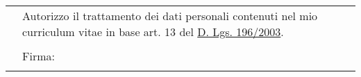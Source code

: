 \documentclass[totpages, helvetica, openbib, italian]{europecv}
\begin{document}
	\null{}
	\flushright
	\begin{tabular}{rp{250pt}}
	 & \small Autorizzo il trattamento dei dati personali contenuti nel mio curriculum vitae in base art. 13 del \href{http://www.garanteprivacy.it/garante/doc.jsp?ID=1311248}{D. Lgs. 196/2003}.\\ 
	 &  \\ 
	 & Firma:\\ 
	 &  \\
	  \bottomrule
	\end{tabular}
\end{document}
